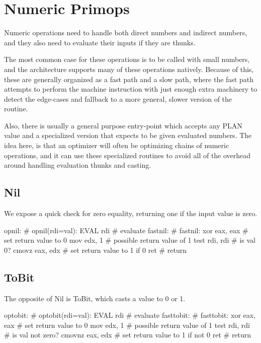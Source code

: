 \section{Numeric Primops}

Numeric operations need to handle both direct numbers and indirect
numbers, and they also need to evaluate their inputs if they are thunks.

The most common case for these operations is to be called with small
numbers, and the architecture supports many of these operations natively.
Because of this, these are generally organized as a fast path and a slow
path, where the fast path attempts to perform the machine instruction
with just enough extra machinery to detect the edge-cases and fallback
to a more general, slower version of the routine.

Also, there is usually a general purpose entry-point which accepts any
PLAN value and a specialized version that expects to be given evaluated
numbers.  The idea here, is that an optimizer will often be optimizing
chains of numeric operations, and it can use these specialized routines
to avoid all of the overhead around handling evaluation thunks and casting.

\subsection{Nil}

We expose a quick check for zero equality, returning one if the input value is
zero.

\begin{asm}
opnil:                                      # opnil(rdi=val):
	EVAL	rdi                         #   evaluate
fastnil:                                    # fastnil:
	xor	eax, eax                    #   set return value to 0
	mov	edx, 1                      #   possible return value of 1
	test	rdi, rdi                    #   is val 0?
	cmovz	eax, edx                    #   set return value to 1 if 0
	ret                                 #   return
\end{asm}

\subsection{ToBit}

The opposite of Nil is ToBit, which casts a value to 0 or 1.

\begin{asm}
optobit:                                    # optobit(rdi=val):
	EVAL	rdi                         #   evaluate
fasttobit:                                  # fasttobit:
	xor	eax, eax                    #   set return value to 0
	mov	edx, 1                      #   possible return value of 1
	test	rdi, rdi                    #   is val not zero?
	cmovnz	eax, edx                    #   set return value to 1 if not 0
	ret                                 #   return
\end{asm}

